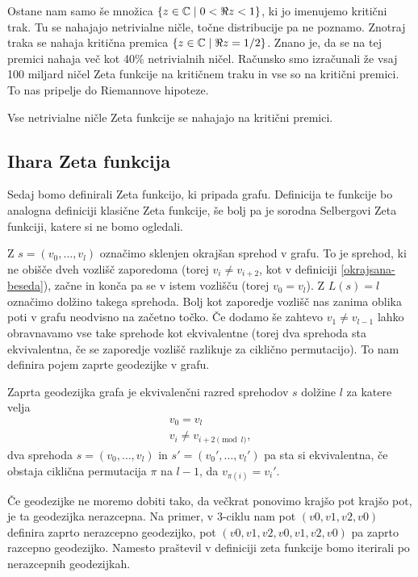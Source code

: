 Ostane nam samo še množica \(\{z\in \mathbb C\mid 0 < \Re z < 1\}\), ki jo imenujemo kritični trak. Tu se nahajajo netrivialne ničle, točne distribucije pa ne poznamo. Znotraj traka se nahaja kritična premica \(\{z\in \mathbb C \mid \Re z = 1/2\}\). Znano je, da se na tej premici nahaja več kot 40\% netrivialnih ničel\cite{Pratt2019}. Računsko smo izračunali že vsaj 100 miljard ničel Zeta funkcije na kritičnem traku in vse so na kritični premici\cite{racunskoniclezeta}. To nas pripelje do Riemannove hipoteze.

\begin{izrek}
    Vse netrivialne ničle Zeta funkcije se nahajajo na kritični premici.
\end{izrek}

\subsection{Ihara Zeta funkcija}
Sedaj bomo definirali Zeta funkcijo, ki pripada grafu. Definicija te funkcije bo analogna definiciji klasične Zeta funkcije, še bolj pa je sorodna Selbergovi Zeta funkciji, katere si ne bomo ogledali\cite{sunada-zetagrafov}.

Z \(s=(v_0, \ldots, v_{l})\) označimo sklenjen okrajšan sprehod v grafu. To je sprehod, ki ne obišče dveh vozlišč zaporedoma (torej \(v_i \neq v_{i+2}\), kot v definiciji \ref{okrajsana-beseda}), začne in konča pa se v istem vozlišču (torej \(v_0 = v_l\)). Z \(L(s)=l\) označimo dolžino takega sprehoda. Bolj kot zaporedje vozlišč nas zanima oblika poti v grafu neodvisno na začetno točko. Če dodamo še zahtevo \(v_1 \neq v_{l-1}\) lahko obravnavamo vse take sprehode kot ekvivalentne (torej dva sprehoda sta ekvivalentna, če se zaporedje vozlišč razlikuje za ciklično permutacijo). To nam definira pojem zaprte geodezijke v grafu. 

\begin{definicija}
    Zaprta geodezijka grafa je ekvivalenčni razred sprehodov \(s\) dolžine \(l\) za katere velja
    \begin{align*}
        v_0 = v_l \\
        v_i \neq v_{i+2 \pmod l},
    \end{align*}
    dva sprehoda \(s=(v_0, \ldots, v_{l})\) in \(s'=(v_0', \ldots, v_{l}')\) pa sta si ekvivalentna, če obstaja ciklična permutacija \(\pi\) na \(l-1\), da \(v_{\pi(i)} = v_i'\). 
\end{definicija}

Če geodezijke ne moremo dobiti tako, da večkrat ponovimo krajšo pot krajšo pot, je ta geodezijka nerazcepna. Na primer, v 3-ciklu nam pot \((v0, v1, v2, v0)\) definira zaprto nerazcepno geodezijko, pot \((v0, v1, v2, v0, v1, v2, v0)\) pa zaprto razcepno geodezijko. Namesto praštevil v definiciji zeta funkcije bomo iterirali po nerazcepnih geodezijkah.


